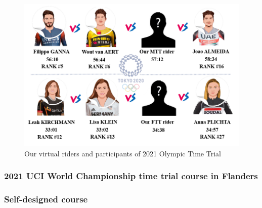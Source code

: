 \begin{figure}[h]
	\centering
	\includegraphics[width=0.8\linewidth]{image/tkyo}
	\caption{Our virtual riders and participants of 2021 Olympic Time Trial}
	\label{tkyo}
\end{figure}
 
\subsubsection{2021 UCI World Championship time trial course in Flanders}


\subsubsection{Self-designed course}
